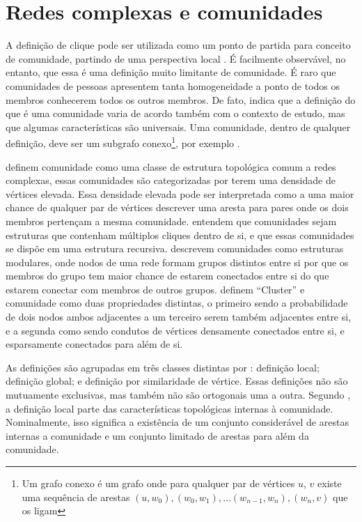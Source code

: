 \documentclass[notes.tex]{subfiles}
\begin{document}
\section{Redes complexas e comunidades\label{sec:redes_complexas}}

A definição de clique pode ser utilizada como um ponto de partida para conceito de comunidade, partindo de uma perspectiva local \cite{fortunato2010community}.
É facilmente observável, no entanto, que essa é uma definição muito limitante de comunidade.
É raro que comunidades de pessoas apresentem tanta homogeneidade a ponto de todos os membros conhecerem todos os outros membros.
De fato,  indica que a definição do que é uma comunidade varia de acordo também com o contexto de estudo, mas que algumas características são universais.
Uma comunidade, dentro de qualquer definição, deve ser um subgrafo conexo\footnote{Um grafo conexo é um grafo onde para qualquer par de vértices $u$, $v$ existe uma sequência de arestas $(u, w_0), (w_0, w_1), \ldots (w_{n-1}, w_n), (w_n, v)$ que os ligam}, por exemplo \cite{fortunato2010community}. 

 definem comunidade como uma classe de estrutura topológica comum a redes complexas, essas comunidades são categorizadas por terem uma densidade de vértices elevada.
Essa densidade elevada pode ser interpretada como a uma maior chance de qualquer par de vértices descrever uma aresta para pares onde os dois membros pertençam a mesma comunidade.
 entendem que comunidades sejam estruturas que contenham múltiplos cliques dentro de si, e que essas comunidades se dispõe em uma estrutura recursiva.
 descrevem comunidades como estruturas modulares, onde nodos de uma rede formam grupos distintos entre si por que os membros do grupo tem maior chance de estarem conectados entre si do que estarem conectar com membros de outros grupos.
 definem ``Cluster'' e comunidade como duas propriedades distintas, o primeiro sendo a probabilidade de dois nodos ambos adjacentes a um terceiro serem também adjacentes entre si, e a segunda como sendo condutos de vértices densamente conectados entre si, e esparsamente conectados para além de si.

As definições são agrupadas em três classes distintas por : definição local; definição global; e definição por similaridade de vértice.
Essas definições não são mutuamente exclusivas, mas também não são ortogonais uma a outra.
Segundo , a definição local parte das características topológicas internas à comunidade.
Nominalmente, isso significa a existência de um conjunto considerável de arestas internas a comunidade e um conjunto limitado de arestas para além da comunidade.
\end{document}
